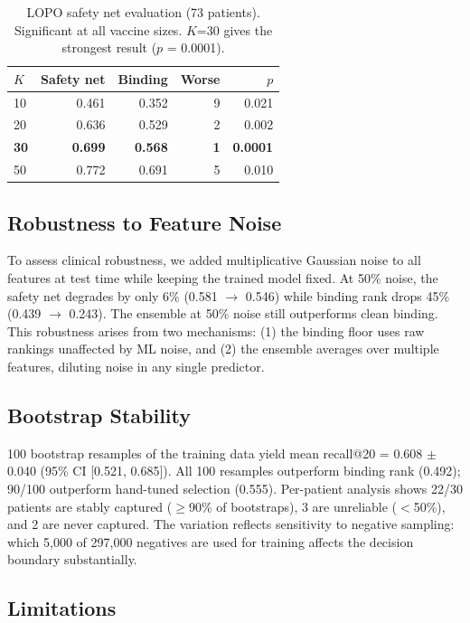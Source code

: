 \documentclass[11pt,twocolumn]{article}
\begin{document}
\begin{table}[ht]
\centering
\footnotesize
\begin{tabular}{@{}lrrrr@{}}
\toprule
$K$ & Safety net & Binding & Worse & $p$ \\
\midrule
10 & 0.461 & 0.352 & 9 & 0.021 \\
20 & 0.636 & 0.529 & 2 & 0.002 \\
\textbf{30} & \textbf{0.699} & \textbf{0.568} & \textbf{1} & \textbf{0.0001} \\
50 & 0.772 & 0.691 & 5 & 0.010 \\
\bottomrule
\end{tabular}
\caption{LOPO safety net evaluation (73 patients). Significant at all vaccine sizes. $K$=30 gives the strongest result ($p$ = 0.0001).}
\end{table}

\subsection{Robustness to Feature Noise}

To assess clinical robustness, we added multiplicative Gaussian noise to all features at test time while keeping the trained model fixed. At 50\% noise, the safety net degrades by only 6\% (0.581 $\to$ 0.546) while binding rank drops 45\% (0.439 $\to$ 0.243). The ensemble at 50\% noise still outperforms clean binding. This robustness arises from two mechanisms: (1) the binding floor uses raw rankings unaffected by ML noise, and (2) the ensemble averages over multiple features, diluting noise in any single predictor.

\subsection{Bootstrap Stability}

100 bootstrap resamples of the training data yield mean recall@20 = 0.608 $\pm$ 0.040 (95\% CI [0.521, 0.685]). All 100 resamples outperform binding rank (0.492); 90/100 outperform hand-tuned selection (0.555). Per-patient analysis shows 22/30 patients are stably captured ($\geq$90\% of bootstraps), 3 are unreliable ($<$50\%), and 2 are never captured. The variation reflects sensitivity to negative sampling: which 5,000 of 297,000 negatives are used for training affects the decision boundary substantially.

\subsection{Limitations}
\end{document}
